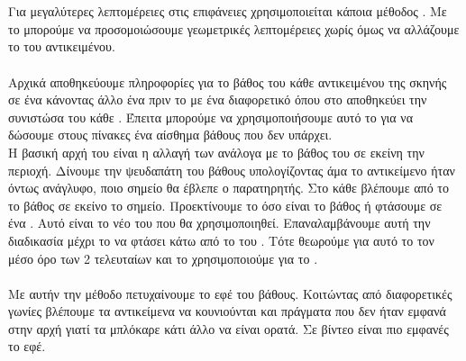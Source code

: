 \documentclass[11pt]{scrartcl} %
\begin{document}
\clearpage
\section{}
Για μεγαλύτερες λεπτομέρειες στις επιφάνειες χρησιμοποιείται κάποια μέθοδος . Με το 
\cite{Parallax} μπορούμε να προσομοιώσουμε γεωμετρικές λεπτομέρειες χωρίς όμως να αλλάζουμε το  του αντικειμένου.
\\\\
Αρχικά αποθηκεύουμε πληροφορίες για το βάθος του κάθε αντικειμένου της σκηνής σε ένα  κάνοντας άλλο
ένα  πριν το  με ένα διαφορετικό  όπου στο  αποθηκεύει την 
συνιστώσα του κάθε . 
Έπειτα μπορούμε να χρησιμοποιήσουμε αυτό το  για να δώσουμε στους πίνακες ένα αίσθημα βάθους που δεν υπάρχει.
\\
Η βασική αρχή του  είναι η αλλαγή των  ανάλογα με το βάθος του  σε
εκείνη την περιοχή. Δίνουμε την ψευδαπάτη του βάθους υπολογίζοντας άμα το αντικείμενο ήταν όντως ανάγλυφο, ποιο σημείο
θα έβλεπε ο παρατηρητής.
Στο κάθε  βλέπουμε από το  το βάθος σε εκείνο το σημείο. Προεκτίνουμε το 
όσο είναι το βάθος ή φτάσουμε σε ένα . Αυτό είναι το νέο  του  που θα χρησιμοποιηθεί. Επαναλαμβάνουμε
αυτή την διαδικασία μέχρι το  να φτάσει κάτω από το  του . Τότε θεωρούμε  για αυτό το 
 τον μέσο όρο των 2 τελευταίων  και το χρησιμοποιούμε για το .
\\\\ 
Με αυτήν την μέθοδο πετυχαίνουμε το εφέ του βάθους. Κοιτώντας από διαφορετικές γωνίες βλέπουμε τα αντικείμενα να κουνιούνται και
πράγματα που δεν ήταν εμφανά στην αρχή γιατί τα μπλόκαρε κάτι άλλο να είναι ορατά. Σε βίντεο είναι πιο εμφανές το εφέ.

\clearpage
{}
\end{document}
